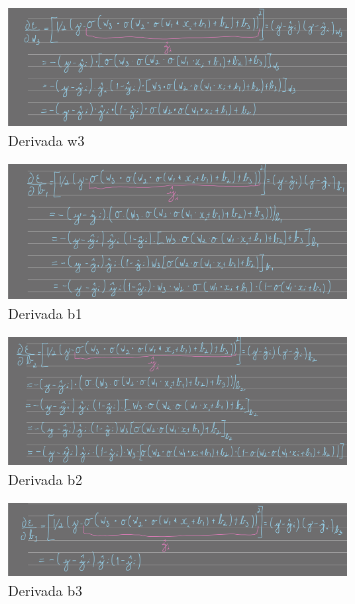 \documentclass{article}
\begin{document}
\begin{figure}
  \centering
  \includegraphics[width=0.8\textwidth]{Derivada_w3.png}
  \caption{Derivada w3}
  \label{fig:gradiente5}
\end{figure}

\begin{figure}
  \centering
  \includegraphics[width=0.8\textwidth]{Derivada_b1.png}
  \caption{Derivada b1}
  \label{fig:gradiente6}
\end{figure}

\begin{figure}
  \centering
  \includegraphics[width=0.8\textwidth]{Derivada_b2.png}
  \caption{Derivada b2}
  \label{fig:gradiente7}
\end{figure}

\begin{figure}
  \centering
  \includegraphics[width=0.8\textwidth]{Derivada_b3.png}
  \caption{Derivada b3}
  \label{fig:gradiente8}
\end{figure}
\newpage
\end{document}
